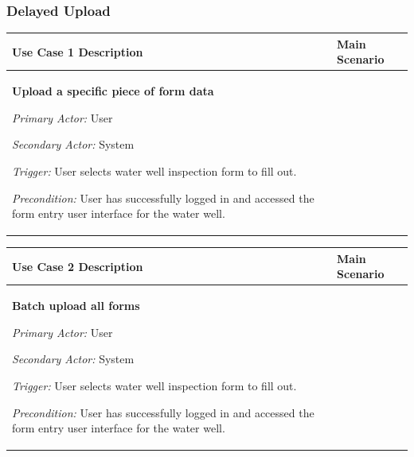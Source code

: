 \documentclass[twoside,letterpaper]{article}
\begin{document}
\subsubsection{Delayed Upload}

\begin{flushleft}
\tablehead{}
\begin{supertabular}{|m{3.17056in}|m{3.5in}|}
\hline

\bfseries\color{black} Use Case 1 Description &
Main Scenario
\\\hline
{\bfseries\color{black} Upload a specific piece of form data}

{\color{black} \textit{Primary Actor:} User}

{\color{black} \textit{Secondary Actor:} System}

{\color{black} \textit{Trigger:} User selects water well inspection form to fill out.}

{\color{black} \textit{Precondition:} User has successfully logged in and accessed the form entry user interface for the water well.}
~
 &


\\\hline
\end{supertabular}
\end{flushleft}

\begin{flushleft}
\tablehead{}
\begin{supertabular}{|m{3.17056in}|m{3.5in}|}
\hline


\bfseries\color{black} Use Case 2 Description &
Main Scenario
\\\hline
{\bfseries\color{black} Batch upload all forms}

{\color{black} \textit{Primary Actor:} User}

{\color{black} \textit{Secondary Actor:} System}

{\color{black} \textit{Trigger:} User selects water well inspection form to fill out.}

{\color{black} \textit{Precondition:} User has successfully logged in and accessed the form entry user interface for the water well.}
~
 &


\\\hline
\end{supertabular}
\end{flushleft}
\end{document}
